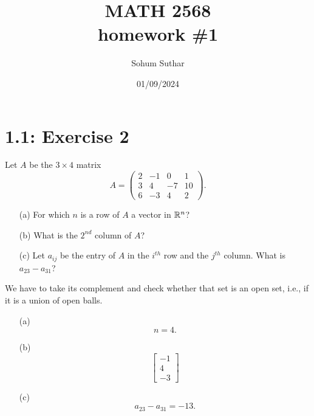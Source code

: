 \documentclass{report}
\title{\Huge{MATH 2568}\\homework \#1}
\author{\huge{Sohum Suthar}}
\date{\huge {01/09/2024}}
\begin{document}
\maketitle
\newpage
{}	
\tableofcontents
\pagebreak

\section*{1.1: Exercise 2} %

Let $A$ be the $3\times 4$ matrix
\[
A=\left(\begin{array}{rrrr} 2 & -1 & 0 & 1 \\ 3 & 4 & -7 & 10\\
        6 & -3 & 4 & 2 \end{array}\right).
\]

\begin{enumerate}
    \item[(a)] For which $n$ is a row of $A$ a vector in $\RR^n$? %
    
    \item[(b)] What is the $2^{nd}$ column of $A$?

    
    \item[(c)] Let $a_{ij}$ be the entry of $A$ in the $i^{th}$ row and the $j^{th}$ column. What is $a_{23}-a_{31}$?

\end{enumerate}




\sol We have to take its complement and check whether that set is an open set, i.e., if it is a union of open balls.

\begin{enumerate}
\item[(a)]     
\[n = 4.\]
\item[(b)]     
\[
    \begin{bmatrix}
        -1 \\
        4 \\
        -3
    \end{bmatrix}
    \]
 
\item[(c)] 
    \[
    a_{23}-a_{31} = -13.
    \]
\end{enumerate}
\end{document}
